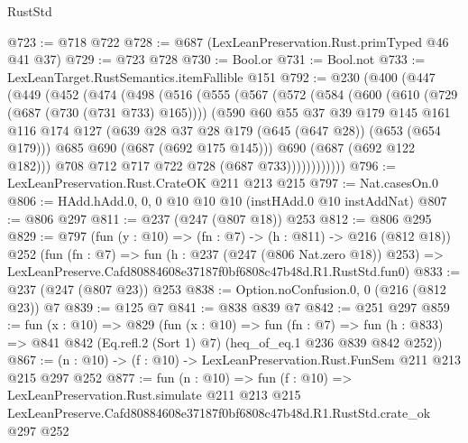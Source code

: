 \begin{lexlean}{RustStd}
\begin{coremodule}
@723 := @718 @722
@728 := @687 (LexLeanPreservation.Rust.primTyped @46 @41 @37)
@729 := @723 @728
@730 := Bool.or
@731 := Bool.not
@733 := LexLeanTarget.RustSemantics.itemFallible @151
@792 := @230
    (@400
      (@447
        (@449
          (@452
            (@474
              (@498
                (@516
                  (@555
                    (@567
                      (@572
                        (@584
                          (@600
                            (@610 (@729 (@687 (@730 (@731 @733) @165))))
                            (@590
                              @60
                              @55
                              @37
                              @39
                              @179
                              @145
                              @161
                              @116
                              @174
                              @127
                              (@639 @28 @37 @28 @179 (@645 (@647 @28)) (@653 (@654 @179)))
                              @685
                              @690
                              (@687 (@692 @175 @145)))
                            @690
                            (@687 (@692 @122 @182)))
                          @708
                          @712
                          @717
                          @722
                          @728
                          (@687 @733))))))))))))
@796 := LexLeanPreservation.Rust.CrateOK @211 @213 @215
@797 := Nat.casesOn.{0}
@806 := HAdd.hAdd.{0, 0, 0} @10 @10 @10 (instHAdd.{0} @10 instAddNat)
@807 := @806 @297
@811 := @237 (@247 (@807 @18)) @253
@812 := @806 @295
@829 := @797
    (fun (y : @10) => (fn : @7) -> (h : @811) -> @216 (@812 @18))
    @252
    (fun (fn : @7) =>
    fun (h : @237 (@247 (@806 Nat.zero @18)) @253) =>
    LexLeanPreserve.Cafd80884608e37187f0bf6808c47b48d.R1.RustStd.fun0)
@833 := @237 (@247 (@807 @23)) @253
@838 := Option.noConfusion.{0, 0} (@216 (@812 @23)) @7
@839 := @125 @7
@841 := @838 @839 @7
@842 := @251 @297
@859 := fun (x : @10) =>
  @829
    (fun (x : @10) =>
    fun (fn : @7) =>
    fun (h : @833) => @841 @842 (Eq.refl.{2} (Sort 1) @7) (heq_of_eq.{1} @236 @839 @842 @252))
@867 := (n : @10) -> (f : @10) -> LexLeanPreservation.Rust.FunSem @211 @213 @215 @297 @252
@877 := fun (n : @10) =>
  fun (f : @10) =>
  LexLeanPreservation.Rust.simulate
    @211
    @213
    @215
    LexLeanPreserve.Cafd80884608e37187f0bf6808c47b48d.R1.RustStd.crate_ok
    @297
    @252
\end{coremodule}
\end{lexlean}
